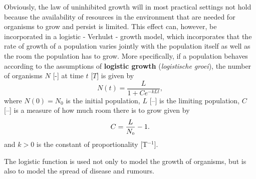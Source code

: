 Obviously, the law of uninhibited growth will in most practical settings not hold because the availability of resources in the environment that are needed for organisms to grow and persist is limited. This effect can, however, be incorporated in a logistic - Verhulst - growth model, which incorporates that the rate of growth of a population varies jointly with the population itself as well as the room the population has to grow.  More specifically,  if a population behaves according to the assumptions of \textbf{logistic growth} (\textit{logistische groei}), the number of organisms $N$ [-] at time $t$ [$T$] is given by 
\begin{equation}
N(t) =\dfrac{L}{1 + Ce^{-kLt}},
\label{logisticgrowth}
\end{equation}
where $N(0) = N_0$ is the initial population,  $L$ [--] is the limiting population, $C$ [--] is a measure of how much room there is to grow given by 
\[C = \dfrac{L}{N_{\mbox{\tiny$0$}}} - 1.\]
 and $k > 0$ is the constant of proportionality [T$^{-1}$]. 

The logistic function is used not only to model the growth of organisms, but is also to model the spread of disease and rumours.

 

